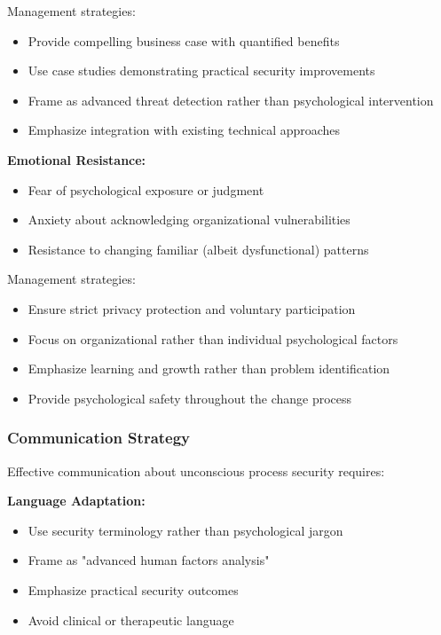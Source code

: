 \documentclass[11pt,a4paper]{article}
\begin{document}
Management strategies:
\begin{itemize}
\item Provide compelling business case with quantified benefits
\item Use case studies demonstrating practical security improvements
\item Frame as advanced threat detection rather than psychological intervention
\item Emphasize integration with existing technical approaches
\end{itemize}

\textbf{Emotional Resistance:}
\begin{itemize}
\item Fear of psychological exposure or judgment
\item Anxiety about acknowledging organizational vulnerabilities
\item Resistance to changing familiar (albeit dysfunctional) patterns
\end{itemize}

Management strategies:
\begin{itemize}
\item Ensure strict privacy protection and voluntary participation
\item Focus on organizational rather than individual psychological factors
\item Emphasize learning and growth rather than problem identification
\item Provide psychological safety throughout the change process
\end{itemize}

\subsubsection{Communication Strategy}

Effective communication about unconscious process security requires:

\textbf{Language Adaptation:}
\begin{itemize}
\item Use security terminology rather than psychological jargon
\item Frame as "advanced human factors analysis"
\item Emphasize practical security outcomes
\item Avoid clinical or therapeutic language
\end{itemize}
\end{document}
